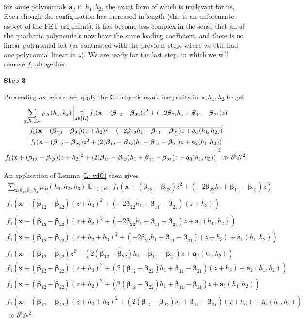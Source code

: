 \documentclass[11pt]{amsart}
\theoremstyle{definition}
\DeclareMathOperator*{\E}{\mathbb{E}}
\newcommand{\ba}{{\textbf{a}}}
\newcommand{\bx}{{\textbf{x}}}
\newcommand{\bbeta}{{\boldsymbol{\beta}}}
\begin{document}
for some polynomials $\ba_j$ in $h_1, h_2$, the exact form of which is irrelevant for us. Even though the configuration has increased in length (this is an unfortunate aspect of the PET argument), it has become less complex in the sense that all of the quadratic polynomials now have the same leading coefficient, and there is no linear polynomial left (as contrasted with the previous step, where we still had one polynomial linear in $z$). We are ready for the last step, in which we will remove $f_2$ altogether.

\smallskip
\textbf{Step 3}
\smallskip

Proceeding as before, we apply the Cauchy--Schwarz inequality in $\bx, h_1, h_2$ to get
\begin{multline*}
    \sum_{\bx, h_1, h_2}\mu_H(h_1, h_2)\left|\E_{z\in[K]}f_1(\bx + (\bbeta_{12}-\bbeta_{22})z^2 + (-2\bbeta_{22}h_1+\bbeta_{11}-\bbeta_{21})z)\right.\\
    \overline{f_1(\bx + (\bbeta_{12}-\bbeta_{22})(z+h_2)^2 + (-2\bbeta_{22}h_1+\bbeta_{11}-\bbeta_{21})z + \ba_1(h_1, h_2))}\\
    \overline{f_1(\bx + (\bbeta_{12}-\bbeta_{22})z^2 + (2(\bbeta_{12}-\bbeta_{22})h_1+\bbeta_{11}-\bbeta_{21} )z + \ba_2(h_1,h_2))}\\
    \left.\vphantom{\E_{z\in[K]}} {f_1(\bx + (\bbeta_{12}-\bbeta_{22})(z+h_2)^2 + (2(\bbeta_{12}-\bbeta_{22})h_1+\bbeta_{11}-\bbeta_{21} )z +  \ba_3(h_1,h_2))}\right|^2\gg \delta^8 N^2. 
\end{multline*}
An application of Lemma \ref{L: vdC} then gives
\begin{multline*}
    \sum_{\bx, h_1, h_2, h_3}\mu_H(h_1, h_2, h_3)\E_{z\in[K]}f_1(\bx + (\bbeta_{12}-\bbeta_{22})z^2 + (-2\bbeta_{22}h_1+\bbeta_{11}-\bbeta_{21})z)\\
    \overline{f_1(\bx + (\bbeta_{12}-\bbeta_{22})(z+h_3)^2 + (-2\bbeta_{22}h_1+\bbeta_{11}-\bbeta_{21})(z+h_3))}\\
    \overline{f_1(\bx + (\bbeta_{12}-\bbeta_{22})(z+h_2)^2 + (-2\bbeta_{22}h_1+\bbeta_{11}-\bbeta_{21})z + \ba_1(h_1, h_2))}\\
    {f_1(\bx + (\bbeta_{12}-\bbeta_{22})(z+h_2+h_3)^2 + (-2\bbeta_{22}h_1+\bbeta_{11}-\bbeta_{21})(z+h_3) + \ba_1(h_1, h_2))}\\
    \overline{f_1(\bx + (\bbeta_{12}-\bbeta_{22})z^2 + (2(\bbeta_{12}-\bbeta_{22})h_1+\bbeta_{11}-\bbeta_{21} )z + \ba_2(h_1,h_2))}\\
    {f_1(\bx + (\bbeta_{12}-\bbeta_{22})(z+h_3)^2 + (2(\bbeta_{12}-\bbeta_{22})h_1+\bbeta_{11}-\bbeta_{21})(z+h_3) + \ba_2(h_1,h_2))}\\
    {f_1(\bx + (\bbeta_{12}-\bbeta_{22})(z+h_2)^2 + (2(\bbeta_{12}-\bbeta_{22})h_1+\bbeta_{11}-\bbeta_{21} )z +  \ba_3(h_1,h_2))}\\
    \overline{f_1(\bx + (\bbeta_{12}-\bbeta_{22})(z+h_2+h_3)^2 + (2(\bbeta_{12}-\bbeta_{22})h_1+\bbeta_{11}-\bbeta_{21} )(z+h_3) +  \ba_3(h_1,h_2))}\\
    \gg \delta^8 N^2. 
\end{multline*}
\end{document}
